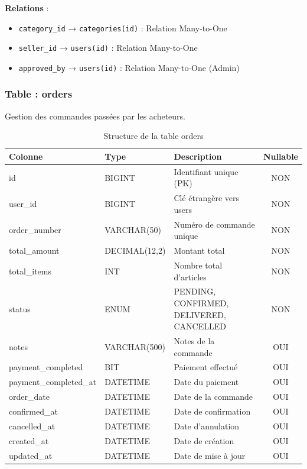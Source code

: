 \documentclass[12pt,a4paper]{report}
\begin{document}
\textbf{Relations} :
\begin{itemize}[noitemsep]
    \item \texttt{category\_id} → \texttt{categories(id)} : Relation Many-to-One
    \item \texttt{seller\_id} → \texttt{users(id)} : Relation Many-to-One
    \item \texttt{approved\_by} → \texttt{users(id)} : Relation Many-to-One (Admin)
\end{itemize}

\subsubsection{Table : orders}

Gestion des commandes passées par les acheteurs.

\begin{table}[H]
    \centering
    \caption{Structure de la table orders}
    \begin{tabularx}{\textwidth}{llXc}
        \toprule
        \textbf{Colonne} & \textbf{Type} & \textbf{Description} & \textbf{Nullable} \\
        \midrule
        id & BIGINT & Identifiant unique (PK) & NON \\
        user\_id & BIGINT & Clé étrangère vers users & NON \\
        order\_number & VARCHAR(50) & Numéro de commande unique & NON \\
        total\_amount & DECIMAL(12,2) & Montant total & NON \\
        total\_items & INT & Nombre total d'articles & NON \\
        status & ENUM & PENDING, CONFIRMED, DELIVERED, CANCELLED & NON \\
        notes & VARCHAR(500) & Notes de la commande & OUI \\
        payment\_completed & BIT & Paiement effectué & OUI \\
        payment\_completed\_at & DATETIME & Date du paiement & OUI \\
        order\_date & DATETIME & Date de la commande & OUI \\
        confirmed\_at & DATETIME & Date de confirmation & OUI \\
        cancelled\_at & DATETIME & Date d'annulation & OUI \\
        created\_at & DATETIME & Date de création & OUI \\
        updated\_at & DATETIME & Date de mise à jour & OUI \\
        \bottomrule
    \end{tabularx}
    \label{tab:orders}
\end{table}
\end{document}
